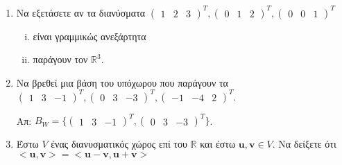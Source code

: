 \begin{enumerate}
        \item Να εξετάσετε αν τα διανύσματα $ 
                    \begin{pmatrix}1 & 2 & 3\end{pmatrix}^{T}, 
                    \begin{pmatrix}0 & 1 & 2\end{pmatrix}^{T} , 
                    \begin{pmatrix}0 & 0 & 1\end{pmatrix}^{T}$ 
                    \begin{enumerate}[i)]
                        \item είναι γραμμικώς ανεξάρτητα 
                        \item παράγουν τον $ \mathbb{R}^{3} $.
                    \end{enumerate}

                \item Να βρεθεί μια βάση του υπόχωρου που παράγουν τα $ 
                    \begin{pmatrix}1 & 3 & -1\end{pmatrix}^{T} , 
                    \begin{pmatrix}0 & 3 & -3\end{pmatrix}^{T} , 
                    \begin{pmatrix}-1 & -4 & 2\end{pmatrix}^{T}$.

                    \hfill Απ: $ B_{W} = 
                    \{ 
                        \begin{pmatrix}1 & 3 & -1\end{pmatrix}^{T} , 
                        \begin{pmatrix}0 & 3 & -3 \end{pmatrix}^{T}
                    \} $. 

                \item Έστω $ V $ ένας διανυσματικός χώρος επί του $\mathbb{R}$ και έστω 
                    $ \mathbf{u}, \mathbf{v} \in V $. Να δείξετε ότι 
                    $ < \mathbf{u}, \mathbf{v} > = < \mathbf{u} - \mathbf{v}, 
                    \mathbf{u} + \mathbf{v} > $


\end{enumerate}
